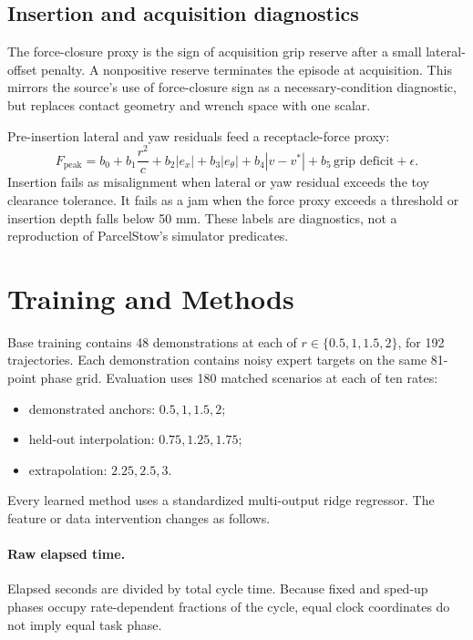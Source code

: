 \documentclass[11pt]{article}
\begin{document}
\subsection{Insertion and acquisition diagnostics}

The force-closure proxy is the sign of acquisition grip reserve after a small lateral-offset penalty. A nonpositive reserve terminates the episode at acquisition. This mirrors the source's use of force-closure sign as a necessary-condition diagnostic, but replaces contact geometry and wrench space with one scalar.

Pre-insertion lateral and yaw residuals feed a receptacle-force proxy:
\begin{equation}
F_{\mathrm{peak}} = b_0+b_1\frac{r^2}{c}+b_2|e_x|+b_3|e_\theta|+b_4|v-v^*|+b_5\,\text{grip deficit}+\epsilon.
\end{equation}
Insertion fails as misalignment when lateral or yaw residual exceeds the toy clearance tolerance. It fails as a jam when the force proxy exceeds a threshold or insertion depth falls below 50 mm. These labels are diagnostics, not a reproduction of ParcelStow's simulator predicates.

\section{Training and Methods}

Base training contains 48 demonstrations at each of $r\in\{0.5,1,1.5,2\}$, for 192 trajectories. Each demonstration contains noisy expert targets on the same 81-point phase grid. Evaluation uses 180 matched scenarios at each of ten rates:
\begin{itemize}[leftmargin=1.5em]
\item demonstrated anchors: $0.5,1,1.5,2$;
\item held-out interpolation: $0.75,1.25,1.75$;
\item extrapolation: $2.25,2.5,3$.
\end{itemize}

Every learned method uses a standardized multi-output ridge regressor. The feature or data intervention changes as follows.

\paragraph{Raw elapsed time.}
Elapsed seconds are divided by total cycle time. Because fixed and sped-up phases occupy rate-dependent fractions of the cycle, equal clock coordinates do not imply equal task phase.
\end{document}
